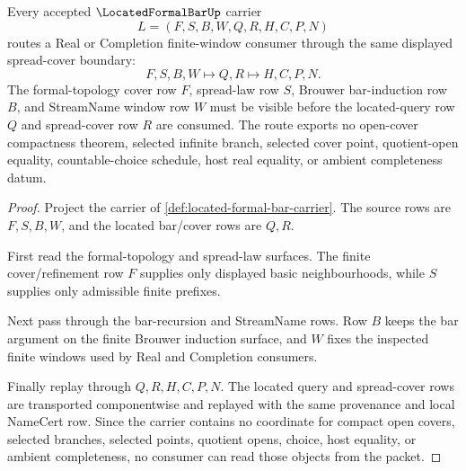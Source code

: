 \begin{theorem}
\label{thm:located-formal-bar-spread-cover}
Every accepted $\LocatedFormalBarUp$ carrier
$$
L=(F,S,B,W,Q,R,H,C,P,N)
$$
routes a Real or Completion finite-window consumer through the same displayed spread-cover boundary:
$$
F,S,B,W \longmapsto Q,R \longmapsto H,C,P,N .
$$
The formal-topology cover row $F$, spread-law row $S$, Brouwer bar-induction row $B$, and StreamName window row $W$ must be visible before the located-query row $Q$ and spread-cover row $R$ are consumed. The route exports no open-cover compactness theorem, selected infinite branch, selected cover point, quotient-open equality, countable-choice schedule, host real equality, or ambient completeness datum.
\end{theorem}
\begin{proof}
Project the carrier of \autoref{def:located-formal-bar-carrier}. The source rows are $F,S,B,W$, and the located bar/cover rows are $Q,R$.

First read the formal-topology and spread-law surfaces. The finite cover/refinement row $F$ supplies only displayed basic neighbourhoods, while $S$ supplies only admissible finite prefixes.

Next pass through the bar-recursion and StreamName rows. Row $B$ keeps the bar argument on the finite Brouwer induction surface, and $W$ fixes the inspected finite windows used by Real and Completion consumers.

Finally replay through $Q,R,H,C,P,N$. The located query and spread-cover rows are transported componentwise and replayed with the same provenance and local NameCert row. Since the carrier contains no coordinate for compact open covers, selected branches, selected points, quotient opens, choice, host equality, or ambient completeness, no consumer can read those objects from the packet.
\end{proof}


